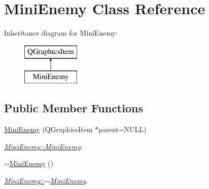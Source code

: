 \hypertarget{class_mini_enemy}{\section{Mini\-Enemy Class Reference}
\label{class_mini_enemy}
}
Inheritance diagram for Mini\-Enemy\-:\begin{figure}[H]
\begin{center}
\leavevmode
\includegraphics[height=2.000000cm]{class_mini_enemy}
\end{center}
\end{figure}
\subsection*{Public Member Functions}
\begin{DoxyCompactItemize}
\item 
\hyperlink{class_mini_enemy_aa3570678639a19f80f20299c0725600b}{Mini\-Enemy} (Q\-Graphics\-Item $\ast$parent=N\-U\-L\-L)
\begin{DoxyCompactList}\small\item\em \hyperlink{class_mini_enemy_aa3570678639a19f80f20299c0725600b}{Mini\-Enemy\-::\-Mini\-Enemy}. \end{DoxyCompactList}\item 
\hypertarget{class_mini_enemy_a088faaf9cd9af25220621a13ec44cd24}{\hyperlink{class_mini_enemy_a088faaf9cd9af25220621a13ec44cd24}{$\sim$\-Mini\-Enemy} ()}\label{class_mini_enemy_a088faaf9cd9af25220621a13ec44cd24}

\begin{DoxyCompactList}\small\item\em \hyperlink{class_mini_enemy_a088faaf9cd9af25220621a13ec44cd24}{Mini\-Enemy\-::$\sim$\-Mini\-Enemy}. \end{DoxyCompactList}\end{DoxyCompactItemize}
